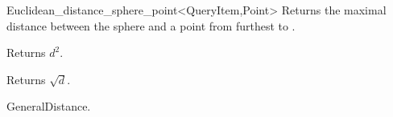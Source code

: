 \begin{ccRefClass}{Euclidean_distance_sphere_point<QueryItem,Point>}
{Returns the maximal distance between the sphere  and
a point from  furthest to .}

 {Returns $d^2$.}

 {Returns $\sqrt d$.}


\ccSeeAlso

GeneralDistance.



\end{ccRefClass}


